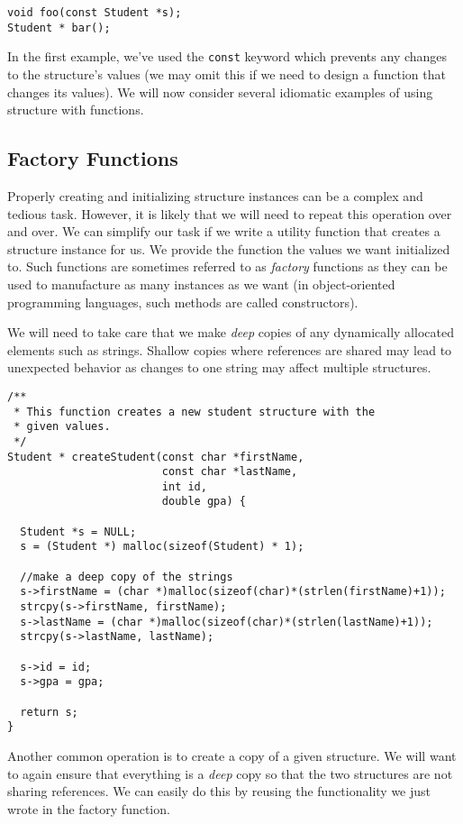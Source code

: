 \begin{verbatim}
void foo(const Student *s);
Student * bar();
\end{verbatim}

In the first example, we've used the \texttt{const} keyword which
prevents any changes to the structure's values (we may omit this if
we need to design a function that changes its values).  We will now
consider several idiomatic examples of using structure with functions.

\subsection{Factory Functions}

Properly creating and initializing structure instances can be a
complex and tedious task.  However, it is likely that we will need
to repeat this operation over and over.  We can simplify our task
if we write a utility function that creates a structure instance for us.
We provide the function the values we want initialized to.  
Such functions are sometimes referred to as \emph{factory} functions
as they can be used to manufacture as many instances as we want
(in object-oriented programming languages, such methods are called
constructors).

We will need to take care that we make  \emph{deep} copies of 
any dynamically allocated elements such as strings.  Shallow
copies  where references are shared may lead to unexpected 
behavior as changes to one string may affect multiple structures.

\begin{verbatim}
/**
 * This function creates a new student structure with the
 * given values.
 */
Student * createStudent(const char *firstName, 
                        const char *lastName, 
                        int id, 
                        double gpa) {

  Student *s = NULL;
  s = (Student *) malloc(sizeof(Student) * 1);

  //make a deep copy of the strings
  s->firstName = (char *)malloc(sizeof(char)*(strlen(firstName)+1));
  strcpy(s->firstName, firstName);
  s->lastName = (char *)malloc(sizeof(char)*(strlen(lastName)+1));
  strcpy(s->lastName, lastName);

  s->id = id;
  s->gpa = gpa;

  return s;
}
\end{verbatim}

Another common operation is to create a copy of a given structure.
We will want to again ensure that everything is a \emph{deep}
copy so that the two structures are not sharing references.  We
can easily do this by reusing the functionality we just wrote in
the factory function.

